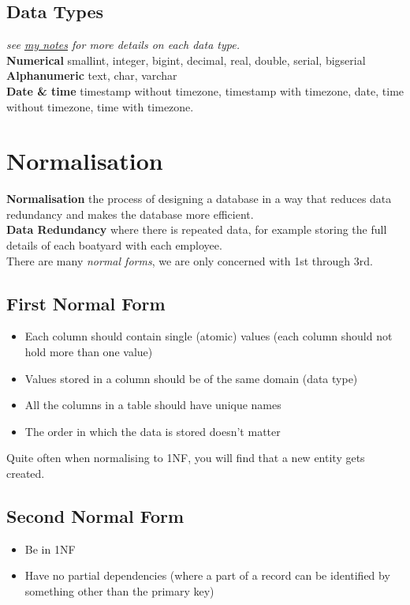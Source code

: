 \documentclass[a4paper,11pt]{article}
\begin{document}
\subsection{Data Types}
\textit{see \href{https://thomasboxall.github.io/uni-notes/01-FIRST-YEAR/M30232-databaseSystemsDevelopment/M30232.pdf}{my notes} for more details on each data type.}\\
\textbf{Numerical} smallint, integer, bigint, decimal, real, double, serial, bigserial\\
\textbf{Alphanumeric} text, char, varchar\\
\textbf{Date \& time} timestamp without timezone, timestamp with timezone, date, time without timezone, time with timezone.

\section{Normalisation}
\textbf{Normalisation} the process of designing a database in a way that reduces data redundancy and makes the database more efficient.\\
\textbf{Data Redundancy} where there is repeated data, for example storing the full details of each boatyard with each employee.\\
There are many \textit{normal forms}, we are only concerned with 1st through 3rd.
\subsection{First Normal Form}
\begin{itemize}
    \item Each column should contain single (atomic) values (each column should not hold more than one value)
    \item Values stored in a column should be of the same domain (data type)
    \item All the columns in a table should have unique names
    \item The order in which the data is stored doesn't matter
\end{itemize}
Quite often when normalising to 1NF, you will find that a new entity gets created.

\subsection{Second Normal Form}
\begin{itemize}
    \item Be in 1NF
    \item Have no partial dependencies (where a part of a record can be identified by something other than the primary key)
\end{itemize}
\end{document}
